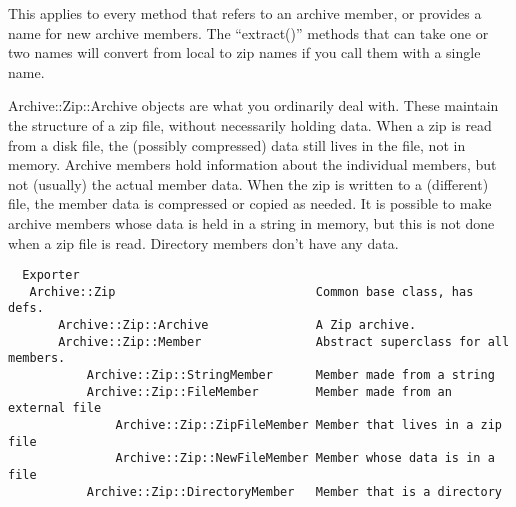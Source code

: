 \documentclass[]{article}
\begin{document}
\begin{description}
\itemsep1pt\parskip0pt
\item[Names of archive members are in Unix format.]
This applies to every method that refers to an archive member, or
provides a name for new archive members. The ``extract()'' methods that
can take one or two names will convert from local to zip names if you
call them with a single name.
\end{description}



Archive::Zip::Archive objects are what you ordinarily deal with. These
maintain the structure of a zip file, without necessarily holding data.
When a zip is read from a disk file, the (possibly compressed) data
still lives in the file, not in memory. Archive members hold information
about the individual members, but not (usually) the actual member data.
When the zip is written to a (different) file, the member data is
compressed or copied as needed. It is possible to make archive members
whose data is held in a string in memory, but this is not done when a
zip file is read. Directory members don't have any data.


\begin{verbatim}
  Exporter
   Archive::Zip                            Common base class, has defs.
       Archive::Zip::Archive               A Zip archive.
       Archive::Zip::Member                Abstract superclass for all members.
           Archive::Zip::StringMember      Member made from a string
           Archive::Zip::FileMember        Member made from an external file
               Archive::Zip::ZipFileMember Member that lives in a zip file
               Archive::Zip::NewFileMember Member whose data is in a file
           Archive::Zip::DirectoryMember   Member that is a directory
\end{verbatim}
\end{document}
